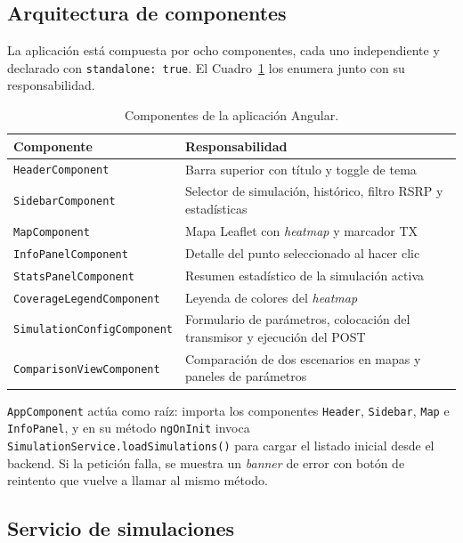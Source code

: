 \subsection{Arquitectura de componentes}
\label{sec:frontend_componentes}

La aplicación está compuesta por ocho componentes, cada uno independiente y declarado
con \texttt{standalone:~true}. El Cuadro~\ref{tab:componentes_angular} los enumera junto
con su responsabilidad.

\begin{table}[H]
\centering
\caption{Componentes de la aplicación Angular.}
\label{tab:componentes_angular}
\begin{tabularx}{\textwidth}{|>{\raggedright\arraybackslash}p{5.8cm}|X|}
\hline
\textbf{Componente} & \textbf{Responsabilidad} \\
\hline
\texttt{HeaderComponent}           & Barra superior con título y toggle de tema \\
\texttt{SidebarComponent}          & Selector de simulación, histórico, filtro RSRP y estadísticas \\
\texttt{MapComponent}              & Mapa Leaflet con \textit{heatmap} y marcador TX \\
\texttt{InfoPanelComponent}        & Detalle del punto seleccionado al hacer clic \\
\texttt{StatsPanelComponent}       & Resumen estadístico de la simulación activa \\
\texttt{CoverageLegendComponent}   & Leyenda de colores del \textit{heatmap} \\
\texttt{SimulationConfigComponent} & Formulario de parámetros, colocación del transmisor y ejecución del POST \\
\texttt{ComparisonViewComponent} & Comparación de dos escenarios en mapas y paneles de parámetros \\
\hline
\end{tabularx}
\end{table}

\texttt{AppComponent} actúa como raíz: importa los componentes
\texttt{Header}, \texttt{Sidebar}, \texttt{Map} e \texttt{InfoPanel}, y en su
método \texttt{ngOnInit} invoca \texttt{SimulationService.loadSimulations()} para
cargar el listado inicial desde el backend. Si la petición falla, se muestra un
\textit{banner} de error con botón de reintento que vuelve a llamar al mismo método.

\subsection{Servicio de simulaciones}
\label{sec:frontend_service}


